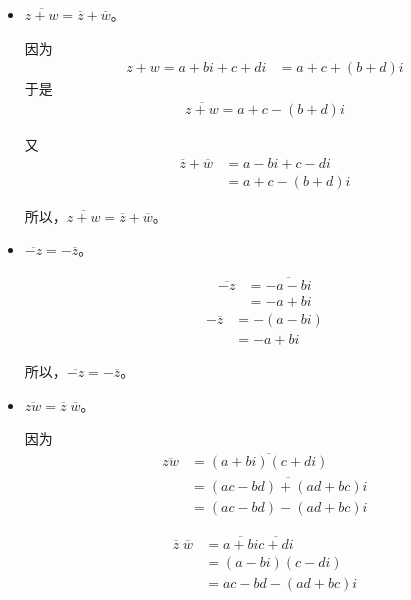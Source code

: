 \documentclass{article}
\begin{document}
\begin{itemize}
  \item $\overline{z + w} = \overline{z} + \overline{w}$。

        因为
        \begin{align*}
          z + w = a + bi + c + di & = a + c + (b + d)i
        \end{align*}
        于是
        \begin{align*}
          \overline{z + w} = a + c - (b + d)i
        \end{align*}

        又
        \begin{align*}
          \overline{z} + \overline{w} & = a - bi + c - di  \\
                                      & = a + c - (b + d)i
        \end{align*}

        所以，$\overline{z + w} = \overline{z} + \overline{w}$。

  \item $\overline{-z} = - \overline{z}$。

        \begin{align*}
          \overline{-z} & = \overline{-a - bi} \\
                        & = -a + bi
        \end{align*}
        \begin{align*}
          - \overline{z} & = -(a - bi) \\
                         & = -a + bi
        \end{align*}

        所以，$\overline{-z} = - \overline{z}$。

  \item $\overline{zw} = \overline{z} \; \overline{w}$。

        因为
        \begin{align*}
          \overline{zw} & = \overline{(a + bi)(c + di)}       \\
                        & = \overline{(ac - bd) + (ad + bc)i} \\
                        & = (ac - bd) - (ad + bc)i
        \end{align*}

        \begin{align*}
          \overline{z} \; \overline{w} & = \overline{a + bi}\overline{c + di} \\
                                       & = (a - bi)(c - di)                   \\
                                       & = ac - bd - (ad + bc)i
        \end{align*}


\end{itemize}
\end{document}
